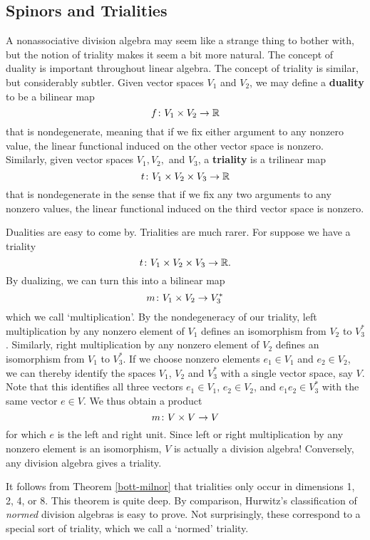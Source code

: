 \subsection{Spinors and Trialities}  \label{triality}   
   
A nonassociative division algebra may seem like a strange thing to   
bother with, but the notion of triality makes it seem a bit more   
natural.  The concept of duality is important throughout linear algebra.   
The concept of triality is similar, but considerably subtler.  Given   
vector spaces $V_1$ and $V_2$, we may define a {\bf duality} to be a   
bilinear map    
\[    f \colon V_1 \times V_2 \to {\mathbb R}   \]   
that is nondegenerate, meaning that if we fix either argument   
to any nonzero value, the linear functional induced on the other vector   
space is nonzero.  Similarly, given vector spaces $V_1,V_2,$ and $V_3$,   
a {\bf triality} is a trilinear map    
\[    t \colon V_1 \times V_2 \times V_3 \to {\mathbb R}   \]   
that is nondegenerate in the sense that if we fix any two arguments to   
any nonzero values, the linear functional induced on the third vector   
space is nonzero.   
   
Dualities are easy to come by.  Trialities are much rarer.  For suppose   
we have a triality  
\[    t \colon V_1 \times V_2 \times V_3 \to {\mathbb R}  . \]   
By dualizing, we can turn this into a bilinear map   
\[     m \colon V_1 \times V_2 \to V_3^\ast     \]   
which we call `multiplication'.  By the nondegeneracy of our triality,   
left multiplication by any nonzero element of $V_1$ defines an   
isomorphism from $V_2$ to $V_3^\ast$.  Similarly, right multiplication   
by any nonzero element of $V_2$ defines an isomorphism from $V_1$ to   
$V_3^\ast$.  If we choose nonzero elements $e_1 \in V_1$ and $e_2 \in   
V_2$, we can thereby identify the spaces $V_1$, $V_2$ and $V_3^\ast$   
with a single vector space, say $V$.   Note that this identifies   
all three vectors $e_1 \in V_1$, $e_2 \in V_2$, and $e_1e_2 \in V_3^\ast$   
with the same vector $e \in V$.   We thus obtain a product   
\[      m \colon V \times V \to V        \]   
for which $e$ is the left and right unit.  Since left or right   
multiplication by any nonzero element is an isomorphism, $V$ is   
actually a division algebra!   Conversely, any division algebra   
gives a triality.     

It follows from Theorem \ref{bott-milnor}  that trialities only occur in
dimensions 1, 2, 4, or 8.  This theorem is quite deep.  By comparison,
Hurwitz's classification of {\it normed} division algebras is easy to
prove.  Not surprisingly, these correspond to a special sort of
triality, which we call a `normed' triality.  
  
